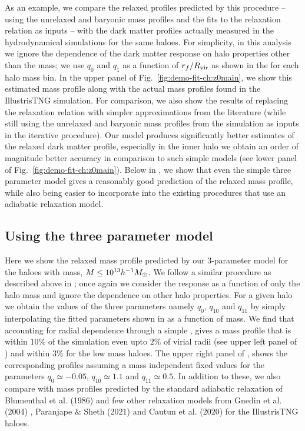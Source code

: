 As an example, we compare the relaxed profiles predicted by this procedure -- using the unrelaxed and baryonic mass profiles and the fits to the relaxation relation  as inputs -- with the dark matter profiles actually measured in the hydrodynamical simulations for the same haloes.
For simplicity, in this analysis we ignore the dependence of the dark matter response on halo properties other than the mass;
we use $q_0$ and $q_1$ as a function of $r_f/R_{\rm{vir}}$ as shown in the  for each halo mass bin. In the upper panel of Fig.~\ref{fig:demo-fit-ch:z0main}, we show this estimated mass profile along with the actual mass profiles found in the IllustrisTNG simulation.
For comparison, we also show the results of replacing the relaxation relation with simpler approximations from the literature (while still using the unrelaxed and baryonic mass profiles from the simulation as inputs in the iterative procedure).
Our model produces significantly better estimates of the relaxed dark matter profile, especially in the inner halo we obtain an order of magnitude better accuracy in comparison to such simple models (see lower panel of Fig.~\ref{fig:demo-fit-ch:z0main}). Below in , we show that even the simple three parameter model gives a reasonably good prediction of the relaxed mass profile, while also being easier to incorporate into the existing procedures that use an adiabatic relaxation model. 



\subsection{Using the three parameter model}
\label{sec:apndx-demo-ch:z0main}
Here we show the relaxed mass profile predicted by our 3-parameter model  for the haloes with mass, $M\leq10^{13}h^{-1}M_{\odot}$. We follow a similar procedure as described above in ; once again we consider the response as a function of only the halo mass and ignore the dependence on other halo properties. For a given halo we obtain the values of the three parameters namely $q_0$, $q_{10}$ and $q_{11}$ by simply interpolating the fitted parameters shown in  as a function of mass. We find that accounting for radial dependence through a simple , gives a mass profile that is within $10\%$ of the simulation even upto $2 \%$ of virial radii (see upper left panel of ) and within $3 \%$ for the low mass haloes. The upper right panel of , shows the corresponding profiles assuming a mass independent fixed values for the parameters $q_0\simeq-0.05$, $q_{10}\simeq1.1$ and $q_{11}\simeq0.5$. In addition to these, we also compare with mass profiles predicted by the standard adiabatic relaxation of Blumenthal et al. (1986) \citep{1986ApJ...301...27B} and few other relaxation models from Gnedin et al. (2004) \citep{2004ApJ...616...16G}, Paranjape $\&$ Sheth (2021) \citep{2021MNRAS.507..632P} and Cautun et al. (2020) \citep{2020MNRAS.494.4291C} for the IllustrisTNG haloes.

